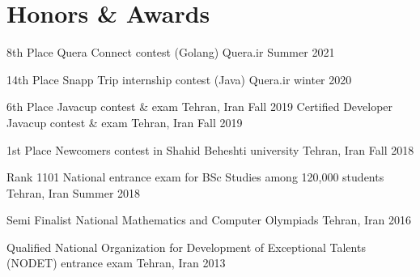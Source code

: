 \section{Honors \& Awards}

\cventry%
  {8th Place}
  {Quera Connect contest (Golang)}
  {Quera.ir}{}
  {Summer 2021}{}

\cventry%
  {14th Place}
  {Snapp Trip internship contest (Java)}
  {Quera.ir}{}
  {winter 2020}{}

\cventry%
  {6th Place}
  {Javacup contest \& exam}
  {Tehran, Iran}{}
  {Fall 2019}{}
\cventry%
  {Certified Developer}
  {Javacup contest \& exam}
  {Tehran, Iran}{}
  {Fall 2019}{}

\cventry%
  {1st Place}
  {Newcomers contest in Shahid Beheshti university}
  {Tehran, Iran}{}
  {Fall 2018}{}

\cventry%
  {Rank 1101}
  {National entrance exam for BSc Studies among 120,000 students}
  {Tehran, Iran}{}
  {Summer 2018}{}

\cventry%
  {Semi Finalist}
  {National Mathematics and Computer Olympiads}
  {Tehran, Iran}{}
  {2016}{}

\cventry%
  {Qualified}
  {National Organization for Development of Exceptional Talents (NODET) entrance exam}
  {Tehran, Iran}{}
  {2013}{}

